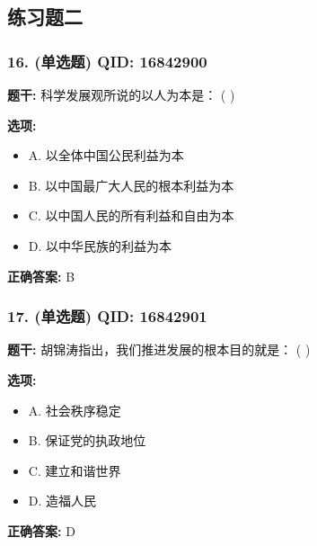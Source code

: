 \documentclass[12pt,UTF8]{ctexart}
\begin{document}
\subsection*{练习题二}

\subsubsection*{16. (单选题) \small QID: 16842900}

\textbf{题干:}
科学发展观所说的以人为本是： ( )

\textbf{选项:}
\begin{itemize}[leftmargin=*]

  \item A. 以全体中国公民利益为本

  \item B. 以中国最广大人民的根本利益为本

  \item C. 以中国人民的所有利益和自由为本

  \item D. 以中华民族的利益为本

\end{itemize}

\textbf{正确答案:}
B

\vspace{0.3em}\hrulefill\vspace{0.7em}

\subsubsection*{17. (单选题) \small QID: 16842901}

\textbf{题干:}
胡锦涛指出，我们推进发展的根本目的就是： ( )

\textbf{选项:}
\begin{itemize}[leftmargin=*]

  \item A. 社会秩序稳定

  \item B. 保证党的执政地位

  \item C. 建立和谐世界

  \item D. 造福人民

\end{itemize}

\textbf{正确答案:}
D

\vspace{0.3em}\hrulefill\vspace{0.7em}
\end{document}
